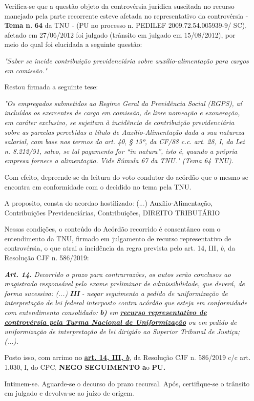 \documentclass[12pt]{article}
\begin{document}
\justifying
\noindent Verifica-se que a questão objeto da controvérsia jurídica suscitada no recurso manejado pela parte recorrente esteve afetada no representativo da controvérsia - \textbf{Tema n. }\textbf{64} da TNU - (PU no processo n. PEDILEF 2009.72.54.005939-9/ SC),  afetado em 27/06/2012 foi julgado (trânsito em julgado em 15/08/2012), por meio do qual foi elucidada a seguinte questão:

\noindent \textit{"Saber se incide contribuição previdenciária sobre auxílio-alimentação para cargos em comissão."}

\noindent Restou firmada a seguinte tese:

\noindent \textit{"Os empregados submetidos ao Regime Geral da Previdência Social (RGPS), aí incluídos os exercentes de cargo em comissão, de livre nomeação e exoneração, em caráter exclusivo, se sujeitam à incidência de contribuição previdenciária sobre as parcelas percebidas a título de Auxílio-Alimentação dada a sua natureza salarial, com base nos termos do art. 40, § 13º, da CF/88 c.c. art. 28, I, da Lei n. 8.212/91, salvo, se tal pagamento for “in natura”, isto é, quando a própria empresa fornece a alimentação. Vide Súmula 67 da TNU." (Tema 64 TNU).}

\noindent Com efeito, depreende-se da leitura do voto condutor do acórdão que o mesmo se encontra em conformidade com o decidido no  tema pela TNU.

\noindent A proposito, consta do acordao hostilizado: (...) Auxílio-Alimentação, Contribuições Previdenciárias, Contribuições, DIREITO TRIBUTÁRIO

\noindent Nessas condições, o conteúdo do Acórdão recorrido é consentâneo com o entendimento da TNU, firmado em julgamento de recurso representativo de controvérsia, o que atrai a incidência da regra prevista pelo art. 14, III, \textit{b,} da Resolução CJF n. 586/2019:

\noindent \textit{\textbf{Art. 14.}}\textit{ Decorrido o prazo para contrarrazões, os autos serão conclusos ao magistrado responsável pelo exame preliminar de admissibilidade, que deverá, de forma sucessiva: (...) }\textit{\textbf{III }}\textit{- negar seguimento a pedido de uniformização de interpretação de lei federal interposto contra acórdão que esteja em conformidade com entendimento consolidado: }\textit{\textbf{b)}}\textit{ em }\uline{\textit{\textbf{recurso representativo de controvérsia pela Turma Nacional de Uniformização}}}\textit{ ou em pedido de uniformização de interpretação de lei dirigido ao Superior Tribunal de Justiça;(...).}

\noindent Posto isso, com arrimo no \uline{\textbf{art. 14, III, }}\uline{\textit{\textbf{b}}}\textit{,} da Resolução CJF n. 586/2019 c/c art. 1.030, I, do CPC, \textbf{NEGO SEGUIMENTO }\textbf{a}o\textbf{ PU}\textbf{.}

\noindent Intimem-se. Aguarde-se o decurso do prazo recursal. Após, certifique-se o trânsito em julgado e devolva-se ao juízo de origem.
\end{document}

